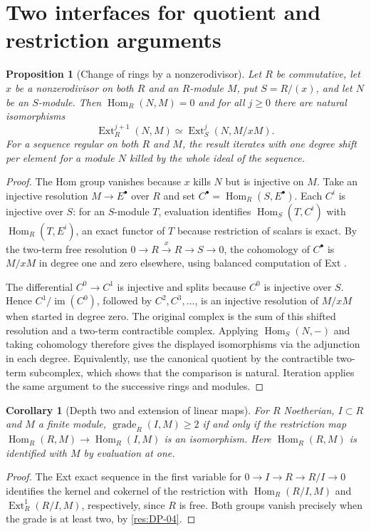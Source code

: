 \documentclass[11pt,oneside,openany]{book}
\newtheorem{proposition}[theorem]{Proposition}
\newtheorem{corollary}[theorem]{Corollary}
\theoremstyle{definition}
\theoremstyle{remark}
\begin{document}
\section{Two interfaces for quotient and restriction arguments}

\begin{proposition}[Change of rings by a nonzerodivisor]\label{res:DP-14}
Let $R$ be commutative, let $x$ be a nonzerodivisor on both $R$ and
an $R$-module $M$, put $S=R/(x)$, and let $N$ be an $S$-module.
Then $\operatorname{Hom}_R(N,M)=0$ and for all $j\ge0$ there are
natural isomorphisms
\[
 \operatorname{Ext}^{j+1}_R(N,M)
    \simeq \operatorname{Ext}_S^j(N,M/xM).
\]
For a sequence regular on both $R$ and $M$, the result iterates
with one degree shift per element for a module $N$ killed by the
whole ideal of the sequence.
\end{proposition}
\begin{proof}
The Hom group vanishes because $x$ kills $N$ but is injective on $M$.
Take an injective resolution $M\to E^\bullet$ over $R$ and set
$C^\bullet=\operatorname{Hom}_R(S,E^\bullet)$.
Each $C^i$ is injective over $S$: for an $S$-module $T$, evaluation
identifies $\operatorname{Hom}_S(T,C^i)$ with
$\operatorname{Hom}_R(T,E^i)$, an exact functor of $T$ because
restriction of scalars is exact. By the two-term free resolution
$0\to R\xrightarrow{x}R\to S\to0$, the cohomology of $C^\bullet$
is $M/xM$ in degree one and zero elsewhere, using balanced
computation of Ext \cite[Theorem ALG-10-C03-S01]{p103}.

The differential $C^0\to C^1$ is injective and splits because
$C^0$ is injective over $S$. Hence
$C^1/\operatorname{im}(C^0)$, followed by $C^2,C^3,\ldots$, is an
injective resolution of $M/xM$ when started in degree zero.
The original complex is the sum of this shifted resolution and
a two-term contractible complex. Applying $\operatorname{Hom}_S(N,-)$
and taking cohomology therefore gives the displayed isomorphisms
via the adjunction in each degree. Equivalently, use the canonical
quotient by the contractible two-term subcomplex, which shows that
the comparison is natural. Iteration applies the same argument
to the successive rings and modules.
\end{proof}

\begin{corollary}[Depth two and extension of linear maps]\label{res:DP-15}
For $R$ Noetherian, $I\subset R$ and $M$ a finite module,
$\operatorname{grade}_R(I,M)\ge2$ if and only if
the restriction map $\operatorname{Hom}_R(R,M)\to\operatorname{Hom}_R(I,M)$
is an isomorphism. Here $\operatorname{Hom}_R(R,M)$ is identified
with $M$ by evaluation at one.
\end{corollary}
\begin{proof}
The Ext exact sequence in the first variable for
$0\to I\to R\to R/I\to0$ identifies the kernel and cokernel of
the restriction with $\operatorname{Hom}_R(R/I,M)$ and
$\operatorname{Ext}_R^1(R/I,M)$, respectively, since $R$ is free.
Both groups vanish precisely when the grade is at least two,
by \ref{res:DP-04}.
\end{proof}
\end{document}
